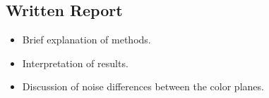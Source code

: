 \documentclass{article}
\begin{document}
\subsection{Written Report}
\begin{itemize}
    \item Brief explanation of methods.
    \item Interpretation of results.
    \item Discussion of noise differences between the color planes.
\end{itemize}
\end{document}
